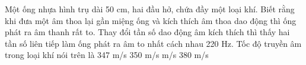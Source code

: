 \begin{ex}%
Một ống nhựa hình trụ dài 50 cm, hai đầu hở, chứa đầy một loại khí. Biết rằng khi đưa một âm thoa lại gần miệng ống và kích thích âm thoa dao động thì ống phát ra âm thanh rất to. Thay đổi tần số dao động âm kích thích thì thấy hai tần số liên tiếp làm ống phát ra âm to nhất cách nhau 220 Hz. Tốc độ truyền âm trong loại khí nói trên là
\choice
{347 m/s}
{350 m/s}
{ m/s}
{380 m/s}
\end{ex} 

